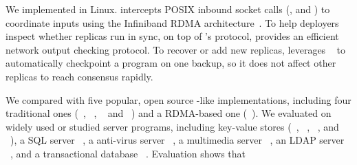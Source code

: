 


We implemented \xxx in Linux. \xxx intercepts POSIX inbound socket calls
(\eg, \accept and \recv) to coordinate inputs using the Infiniband
RDMA architecture~\cite{infiniband}. To help deployers inspect whether replicas 
run in sync, on top of \xxx's \paxos protocol, \xxx provides an efficient 
network output checking protocol. To recover or add new replicas, \xxx 
leverages \criu~\cite{criu} to automatically checkpoint a program on one 
backup, so it does not affect other replicas to reach consensus rapidly.


We compared \xxx with five popular, open source \paxos-like implementations,
including four traditional ones (\libpaxos~\cite{libpaxos},
\zookeeper~\cite{zookeeper}, \crane~\cite{crane:sosp15} and
\spaxos~\cite{spaxos}) and a RDMA-based one (\dare~\cite{dare:hpdc15}). We
evaluated \xxx on \nprog widely used or studied server programs, including
\nkvprog key-value stores (\redis~\cite{redis}, \memcached~\cite{memcached},
\ssdb~\cite{ssdb}, and \mongodb~\cite{mongodb}), a SQL server
\mysql~\cite{mysql}, a anti-virus server \clamav~\cite{clamav}, a multimedia
server \mediatomb~\cite{mediatomb}, an LDAP server \openldap~\cite{openldap}, 
and a transactional database \calvin~\cite{calvin:sigmod12}. Evaluation shows 
that

